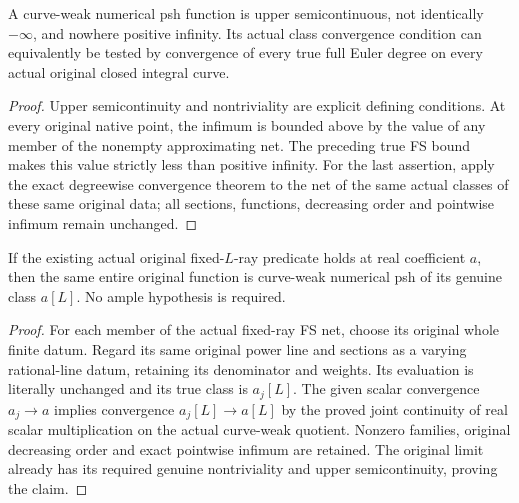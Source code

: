 \begin{theorem}
\label{thm:native-numerical-curve-weak-psh-properties}
\leanok
{}
A curve-weak numerical psh function is upper semicontinuous, not identically
$-\infty$, and nowhere positive infinity. Its actual class convergence
condition can equivalently be tested by convergence of every true full
Euler degree on every actual original closed integral curve.
\end{theorem}
\begin{proof}
Upper semicontinuity and nontriviality are explicit defining conditions.
At every original native point, the infimum is bounded above by the
value of any member of the nonempty approximating net. The preceding
true FS bound makes this value strictly less than positive infinity.
For the last assertion, apply the exact degreewise convergence theorem
to the net of the same actual classes of these same original data;
all sections, functions, decreasing order and pointwise infimum remain
unchanged.
\end{proof}

\begin{theorem}
\label{thm:native-numerical-curve-weak-psh-from-ray}
\leanok
{}
If the existing actual original fixed-$L$-ray predicate holds at real
coefficient $a$, then the same entire original function is curve-weak
numerical psh of its genuine class $a[L]$. No ample hypothesis is required.
\end{theorem}
\begin{proof}
For each member of the actual fixed-ray FS net, choose its original whole
finite datum. Regard its same original power line and sections as a varying
rational-line datum, retaining its denominator and weights. Its evaluation
is literally unchanged and its true class is $a_j[L]$. The given scalar
convergence $a_j\to a$ implies convergence $a_j[L]\to a[L]$ by the proved
joint continuity of real scalar multiplication on the actual curve-weak
quotient. Nonzero families, original decreasing order and exact pointwise
infimum are retained. The original limit already has its required genuine
nontriviality and upper semicontinuity, proving the claim.
\end{proof}

